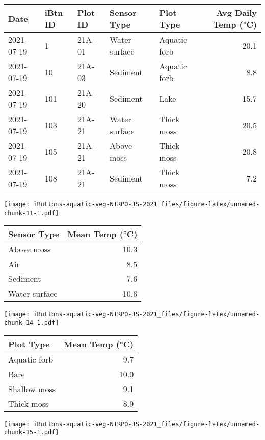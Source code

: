 \documentclass[
]{article}
\begin{document}
\begin{longtable}[]{@{}lllllr@{}}
\toprule
Date & iBtn ID & Plot ID & Sensor Type & Plot Type & Avg Daily Temp
(°C) \\
\midrule
\endhead
2021-07-19 & 1 & 21A-01 & Water surface & Aquatic forb & 20.1 \\
2021-07-19 & 10 & 21A-03 & Sediment & Aquatic forb & 8.8 \\
2021-07-19 & 101 & 21A-20 & Sediment & Lake & 15.7 \\
2021-07-19 & 103 & 21A-21 & Water surface & Thick moss & 20.5 \\
2021-07-19 & 105 & 21A-21 & Above moss & Thick moss & 20.8 \\
2021-07-19 & 108 & 21A-21 & Sediment & Thick moss & 7.2 \\
\bottomrule
\end{longtable}

\texttt{[image: iButtons-aquatic-veg-NIRPO-JS-2021\_files/figure-latex/unnamed-chunk-11-1.pdf]}

\begin{longtable}[]{@{}lr@{}}
\toprule
Sensor Type & Mean Temp (°C) \\
\midrule
\endhead
Above moss & 10.3 \\
Air & 8.5 \\
Sediment & 7.6 \\
Water surface & 10.6 \\
\bottomrule
\end{longtable}

\texttt{[image: iButtons-aquatic-veg-NIRPO-JS-2021\_files/figure-latex/unnamed-chunk-14-1.pdf]}

\begin{longtable}[]{@{}lr@{}}
\toprule
Plot Type & Mean Temp (°C) \\
\midrule
\endhead
Aquatic forb & 9.7 \\
Bare & 10.0 \\
Shallow moss & 9.1 \\
Thick moss & 8.9 \\
\bottomrule
\end{longtable}

\texttt{[image: iButtons-aquatic-veg-NIRPO-JS-2021\_files/figure-latex/unnamed-chunk-15-1.pdf]}
\end{document}
